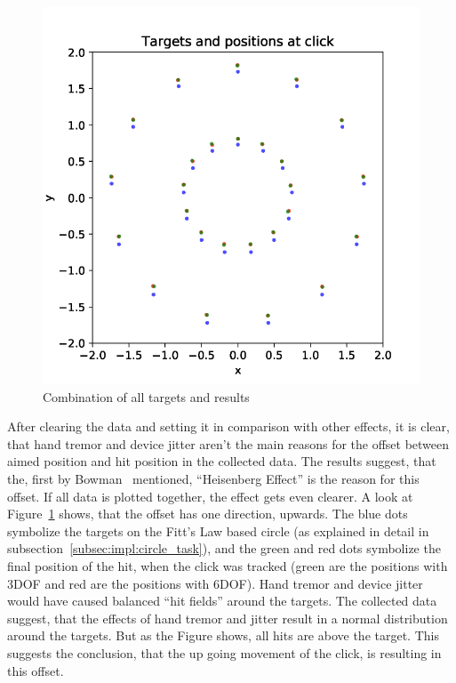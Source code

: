 \begin{figure}[h]
    \centering
    \includegraphics[width=.75\columnwidth]{graphics/graphs/final_plot.pdf}
    \caption{Combination of all targets and results}
    \label{fig:plot}
\end{figure}

After clearing the data and setting it in comparison with other effects, it is clear, that hand tremor and device jitter aren't the main reasons for the offset between aimed position and hit position in the collected data. The results suggest, that the, first by Bowman~\cite{bowman_using_2001} mentioned, ``Heisenberg Effect'' is the reason for this offset. 
\newline
\newline
If all data is plotted together, the effect gets even clearer. A look at Figure~\ref{fig:plot} shows, that the offset has one direction, upwards. The blue dots symbolize the targets on the Fitt's Law based circle (as explained in detail in subsection~\ref{subsec:impl:circle_task}), and the green and red dots symbolize the final position of the hit, when the click was tracked (green are the positions with 3DOF and red are the positions with 6DOF). Hand tremor and device jitter would have caused balanced ``hit fields'' around the targets. The collected data suggest, that the effects of hand tremor and jitter result in a normal distribution around the targets. But as the Figure shows, all hits are above the target. This suggests the conclusion, that the up going movement of the click, is resulting in this offset. 